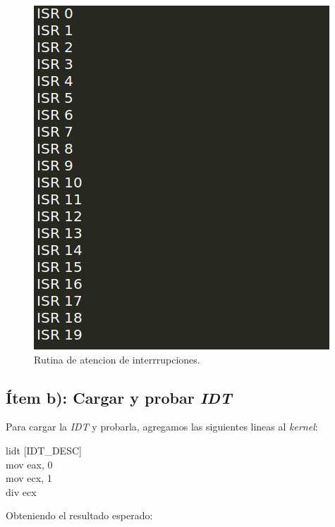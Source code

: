   \begin{figure}[H]
\begin{center}
  \includegraphics[width=\linewidth]{ejercicio2/israsm.png}
  \caption{{\small Rutina de atencion de interrrupciones.} }
\endminipage
\end{center}
\end{figure}


\subsection{Ítem b): Cargar y probar \textit{IDT}}

Para cargar la \textit{IDT} y probarla, agregamos las siguientes lineas al \textit{kernel}:

\begin{center}
    lidt [IDT\_DESC]\\
    mov eax, 0  $~~~~~~~$  \\
    mov ecx, 1 $~~~~~~~$    \\
    div ecx$~~~~~~~~~~~~~$
\end{center}

Obteniendo el resultado esperado:

